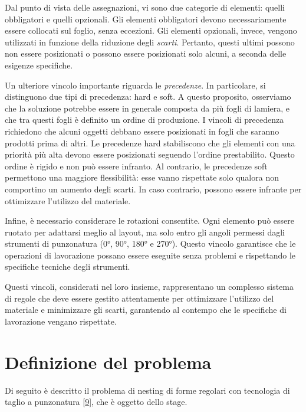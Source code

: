 Dal punto di vista delle assegnazioni, vi sono due categorie di elementi: quelli obbligatori e quelli opzionali. Gli elementi obbligatori devono necessariamente essere collocati sul foglio, senza eccezioni. Gli elementi opzionali, invece, vengono utilizzati in funzione della riduzione degli \emph{scarti}\glsfirstoccur. Pertanto, questi ultimi possono non essere posizionati o possono essere posizionati solo alcuni, a seconda delle esigenze specifiche.

Un ulteriore vincolo importante riguarda le \emph{precedenze}\glsfirstoccur. In particolare, si distinguono due tipi di precedenza: hard e soft. A questo proposito, osserviamo che la soluzione potrebbe essere in generale composta da più fogli di lamiera, e che tra questi fogli è definito un ordine di produzione. I vincoli di precedenza richiedono che alcuni oggetti debbano essere posizionati in fogli che saranno prodotti prima di altri. Le precedenze hard stabiliscono che gli elementi con una priorità più alta devono essere posizionati seguendo l'ordine prestabilito. Questo ordine è rigido e non può essere infranto. Al contrario, le precedenze soft permettono una maggiore flessibilità: esse vanno rispettate solo qualora non comportino un aumento degli scarti. In caso contrario, possono essere infrante per ottimizzare l’utilizzo del materiale.

Infine, è necessario considerare le rotazioni consentite. Ogni elemento può essere ruotato per adattarsi meglio al layout, ma solo entro gli angoli permessi dagli strumenti di punzonatura (0°, 90°, 180° e 270°). Questo vincolo garantisce che le operazioni di lavorazione possano essere eseguite senza problemi e rispettando le specifiche tecniche degli strumenti.

Questi vincoli, considerati nel loro insieme, rappresentano un complesso sistema di regole che deve essere gestito attentamente per ottimizzare l’utilizzo del materiale e minimizzare gli scarti, garantendo al contempo che le specifiche di lavorazione vengano rispettate.

\section{Definizione del problema} \hypertarget{statement}{}

Di seguito è descritto il problema di nesting di forme regolari con tecnologia di taglio a punzonatura [\hyperlink{bibliografia}{9}], che è oggetto dello stage.

